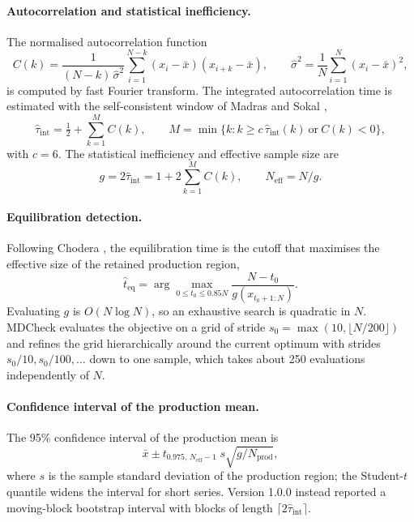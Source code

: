 \documentclass[9pt,lessons]{livecoms}
\begin{document}
\paragraph{Autocorrelation and statistical inefficiency.}
The normalised autocorrelation function
\begin{equation}
C(k) = \frac{1}{(N-k)\,\hat\sigma^2}\sum_{i=1}^{N-k}(x_i-\bar x)(x_{i+k}-\bar x), \qquad \hat\sigma^2 = \frac{1}{N}\sum_{i=1}^{N}(x_i-\bar x)^2,
\end{equation}
is computed by fast Fourier transform. The integrated autocorrelation time is estimated with the self-consistent window of Madras and Sokal \cite{madras1988,sokal1997},
\begin{equation}
\hat\tau_{\mathrm{int}} = \tfrac12 + \sum_{k=1}^{M} C(k), \qquad M = \min\{k : k \ge c\,\hat\tau_{\mathrm{int}}(k)\ \text{or}\ C(k) < 0\},
\end{equation}
with $c = 6$. The statistical inefficiency and effective sample size are
\begin{equation}
g = 2\hat\tau_{\mathrm{int}} = 1 + 2\sum_{k=1}^{M} C(k), \qquad N_{\mathrm{eff}} = N/g .
\end{equation}

\paragraph{Equilibration detection.}
Following Chodera \cite{chodera2016simple}, the equilibration time is the cutoff that maximises the effective size of the retained production region,
\begin{equation}
\hat t_{\mathrm{eq}} = \arg\max_{0 \le t_0 \le 0.85N} \frac{N - t_0}{g(x_{t_0+1:N})}.
\end{equation}
Evaluating $g$ is $O(N\log N)$, so an exhaustive search is quadratic in $N$. MDCheck evaluates the objective on a grid of stride $s_0=\max(10, \lfloor N/200\rfloor)$ and refines the grid hierarchically around the current optimum with strides $s_0/10, s_0/100,\dots$ down to one sample, which takes about 250 evaluations independently of $N$.

\paragraph{Confidence interval of the production mean.}
The 95\% confidence interval of the production mean is
\begin{equation}
\bar x \pm t_{0.975,\,N_{\mathrm{eff}}-1}\; s\sqrt{g/N_{\mathrm{prod}}},
\label{eq:ci}
\end{equation}
where $s$ is the sample standard deviation of the production region; the Student-$t$ quantile \cite{student1908} widens the interval for short series. Version 1.0.0 instead reported a moving-block bootstrap interval \cite{kunsch1989} with blocks of length $\lceil 2\hat\tau_{\mathrm{int}}\rceil$.
\end{document}
